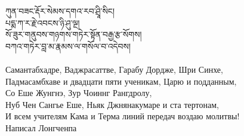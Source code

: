 
\ru


{\ti
ཀུན་བཟང་རྡོར་སེམས་དགའ་རབ་ཤྲཱི་སིང།\\
པདྨ་ཀ་ར་རྗེ་འབངས་ཉི་ཤུ་ལྔ།\\
སོ་ཟུར་གནུབས་གཉགས་གཏེར་སྟོན་བརྒྱ་རྩ་སོགས།\\
བཀའ་གཏེར་བླ་མ་རྣམས་ལ་གསོལ་བ་འདེབས།}\\
\\
\ru
Самантабхадре, Ваджрасаттве, Гарабу Дордже, Шри Синхе,\\
Падмасамбхаве и двадцати пяти ученикам, Царю и подданным,\\
Со Еше Жунгнэ, Зур Чоиннг Рангдролу,\\
Нуб Чен Сангье Еше, Ньяк Джнянакумаре и ста тертонам,\\
И всем учителям Кама и Терма линий передач воздаю молитвы!\\
\scriptsize Написал Лонгченпа\normalsize\\
\\


